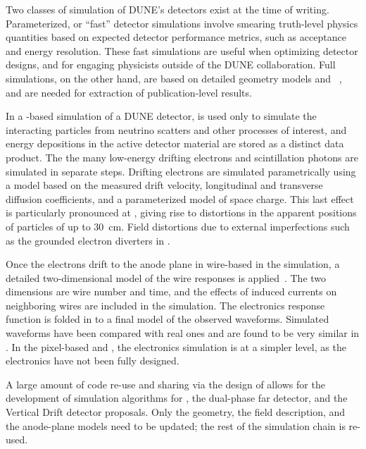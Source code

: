 Two classes of simulation of DUNE's detectors exist at the time of writing.  Parameterized, or ``fast'' detector simulations involve smearing truth-level physics quantities based on expected detector performance metrics, such as acceptance and energy resolution.  These fast simulations are useful when optimizing detector designs, and for engaging physicists outside of the DUNE collaboration.  Full simulations, on the other hand, are based on detailed geometry models and ~\cite{Agostinelli:2002hh,Allison:2016lfl}, and are needed for extraction of publication-level results.

In a -based simulation of a DUNE detector,  is used only to simulate the interacting particles from neutrino scatters and other processes of interest, and energy depositions in the active detector material are stored as a distinct data product. The the many low-energy drifting electrons and scintillation photons are simulated in separate steps.  Drifting electrons are simulated parametrically using a model based on the measured drift velocity, longitudinal and transverse diffusion coefficients, and a parameterized model of space charge.  This last effect is particularly pronounced at , giving rise to distortions in the apparent positions of particles of up to 30~cm.  Field distortions due to external imperfections such as the grounded electron diverters in .

Once the electrons drift to the anode plane in wire-based  in the simulation, a detailed two-dimensional model of the wire responses is applied~\cite{Abi:2020mwi}.  The two dimensions are wire number and time, and the effects of induced currents on neighboring wires are included in the simulation.  The electronics response function is folded in to a final model of the observed waveforms.  Simulated waveforms have been compared with real ones and are found to be very similar in .
In the pixel-based  and , the electronics simulation is at a simpler level, as the electronics have not been fully designed.

A large amount of code re-use and sharing via the design of  allows for the development of simulation algorithms for , the dual-phase far detector, and the Vertical Drift detector proposals.  Only the geometry, the field description, and the anode-plane models need to be updated; the rest of the simulation chain is re-used.

